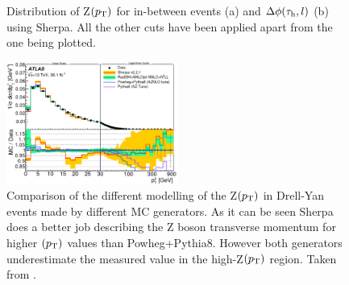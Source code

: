 \begin{figure}[H]
	\centering
	\hfill
	\caption{Distribution of Z$(p_\text{T})$ for in-between events (a) and $\Delta\phi(\tau_\text{h},l)$ (b) using Sherpa. All the other cuts have been applied apart from the one being plotted.}
	\label{Fig19}
\end{figure}
\begin{figure}[H]
	\centering
	\includegraphics[width=0.5\textwidth]{figures/Fig20}
	\caption{Comparison of the different modelling of the Z$(p_\text{T})$ in Drell-Yan events made by different MC generators. As it can be seen Sherpa does a better job describing the Z boson transverse momentum for higher $(p_\text{T})$ values than Powheg+Pythia8. However both generators underestimate the measured value in the high-Z$(p_\text{T})$ region. Taken from \cite{Aad:2019wmn}.}
	\label{Fig20}
\end{figure}

